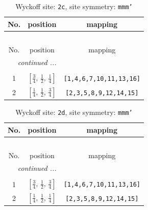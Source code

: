 \documentclass[fleqn,8pt]{jsarticle}
\begin{document}
\renewcommand{\arraystretch}{1.2}
\begin{longtable}{ccc}
\caption{Wyckoff site: {\tt 2c}, site symmetry: {\tt mmm'}}
 \\
 \hline \hline
No. & position & mapping \\ \hline \endfirsthead

\multicolumn{2}{l}{\tablename\ \thetable{}} \\
 \hline \hline
No. & position & mapping \\ \hline \endhead

 \hline \hline
\multicolumn{2}{r}{\footnotesize\it continued ...} \\ \endfoot

 \hline \hline
\multicolumn{2}{r}{} \\ \endlastfoot

1 & $\left[ \frac{3}{4},\, \frac{1}{2},\, \frac{1}{4} \right]$ & {\tt [1,4,6,7,10,11,13,16]} \\ \hline
2 & $\left[ \frac{1}{4},\, \frac{1}{2},\, \frac{3}{4} \right]$ & {\tt [2,3,5,8,9,12,14,15]} \\
\end{longtable}
\renewcommand{\arraystretch}{1.2}
\begin{longtable}{ccc}
\caption{Wyckoff site: {\tt 2d}, site symmetry: {\tt mmm'}}
 \\
 \hline \hline
No. & position & mapping \\ \hline \endfirsthead

\multicolumn{2}{l}{\tablename\ \thetable{}} \\
 \hline \hline
No. & position & mapping \\ \hline \endhead

 \hline \hline
\multicolumn{2}{r}{\footnotesize\it continued ...} \\ \endfoot

 \hline \hline
\multicolumn{2}{r}{} \\ \endlastfoot

1 & $\left[ \frac{3}{4},\, \frac{1}{2},\, \frac{3}{4} \right]$ & {\tt [1,4,6,7,10,11,13,16]} \\ \hline
2 & $\left[ \frac{1}{4},\, \frac{1}{2},\, \frac{1}{4} \right]$ & {\tt [2,3,5,8,9,12,14,15]} \\
\end{longtable}
\renewcommand{\arraystretch}{1.2}
\end{document}
